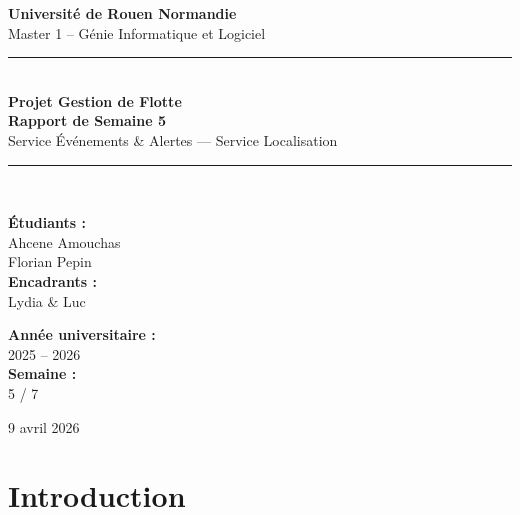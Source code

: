 \documentclass[12pt,a4paper]{article}
\begin{document}
\begin{titlepage}
  \centering
  \vspace*{1cm}

  {\Large\textbf{Universit\'{e} de Rouen Normandie}\\[0.3cm]
  \large Master 1 -- G\'{e}nie Informatique et Logiciel}

  \vspace{1.5cm}
  {\color{primary!55}\rule{\linewidth}{0.5mm}}\\[0.45cm]

  {\Huge\sffamily\bfseries\color{primary} Projet Gestion de Flotte\\[0.35cm]}
  {\LARGE\sffamily\bfseries\color{primary!80!black} Rapport de Semaine 5}\\[0.35cm]
  {\large\sffamily\color{primary!65!black} Service \'{E}v\'{e}nements \& Alertes --- Service Localisation}

  {\color{primary!55}\rule{\linewidth}{0.5mm}}\\[1.5cm]

  \begin{minipage}{0.45\textwidth}
    \begin{flushleft}
      \textbf{\'{E}tudiants :}\\
      Ahcene Amouchas \\
      Florian Pepin \\[0.5cm]
      \textbf{Encadrants :}\\
      Lydia \& Luc
    \end{flushleft}
  \end{minipage}
  \hfill
  \begin{minipage}{0.45\textwidth}
    \begin{flushright}
      \textbf{Ann\'{e}e universitaire :}\\
      2025 -- 2026 \\[0.5cm]
      \textbf{Semaine :}\\
      5 / 7
    \end{flushright}
  \end{minipage}

  \vfill
  {\large 9 avril 2026}
\end{titlepage}

\tableofcontents
\newpage

\section{Introduction}
\end{document}
